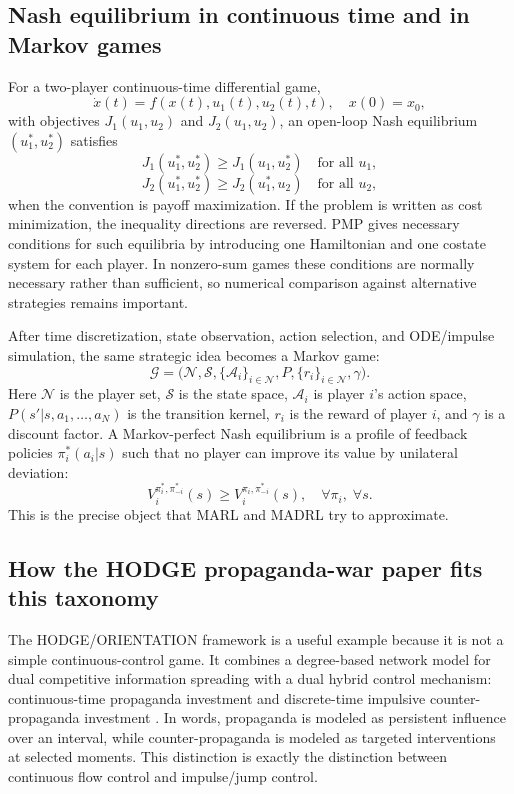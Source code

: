 \documentclass[11pt,a4paper]{article}
\begin{document}
\subsection{Nash equilibrium in continuous time and in Markov games}
For a two-player continuous-time differential game,
\begin{equation}
\dot{x}(t)=f(x(t),u_1(t),u_2(t),t),\quad x(0)=x_0,
\end{equation}
with objectives $J_1(u_1,u_2)$ and $J_2(u_1,u_2)$, an open-loop Nash equilibrium $(u_1^*,u_2^*)$ satisfies
\begin{equation}
J_1(u_1^*,u_2^*)\ge J_1(u_1,u_2^*)\quad \text{for all }u_1,
\end{equation}
\begin{equation}
J_2(u_1^*,u_2^*)\ge J_2(u_1^*,u_2)\quad \text{for all }u_2,
\end{equation}
when the convention is payoff maximization. If the problem is written as cost minimization, the inequality directions are reversed. PMP gives necessary conditions for such equilibria by introducing one Hamiltonian and one costate system for each player. In nonzero-sum games these conditions are normally necessary rather than sufficient, so numerical comparison against alternative strategies remains important.

After time discretization, state observation, action selection, and ODE/impulse simulation, the same strategic idea becomes a Markov game:
\begin{equation}
\mathcal{G}=\big(\mathcal{N},\mathcal{S},\{\mathcal{A}_i\}_{i\in\mathcal{N}},P,\{r_i\}_{i\in\mathcal{N}},\gamma\big).
\end{equation}
Here $\mathcal{N}$ is the player set, $\mathcal{S}$ is the state space, $\mathcal{A}_i$ is player $i$'s action space, $P(s'|s,a_1,\ldots,a_N)$ is the transition kernel, $r_i$ is the reward of player $i$, and $\gamma$ is a discount factor. A Markov-perfect Nash equilibrium is a profile of feedback policies $\pi_i^*(a_i|s)$ such that no player can improve its value by unilateral deviation:
\begin{equation}
V_i^{\pi_i^*,\pi_{-i}^*}(s)\ge V_i^{\pi_i,\pi_{-i}^*}(s),\quad \forall \pi_i,\; \forall s.
\end{equation}
This is the precise object that MARL and MADRL try to approximate.

\subsection{How the HODGE propaganda-war paper fits this taxonomy}
The HODGE/ORIENTATION framework is a useful example because it is not a simple continuous-control game. It combines a degree-based network model for dual competitive information spreading with a dual hybrid control mechanism: continuous-time propaganda investment and discrete-time impulsive counter-propaganda investment \cite{cheng2024propaganda}. In words, propaganda is modeled as persistent influence over an interval, while counter-propaganda is modeled as targeted interventions at selected moments. This distinction is exactly the distinction between continuous flow control and impulse/jump control.
\end{document}
